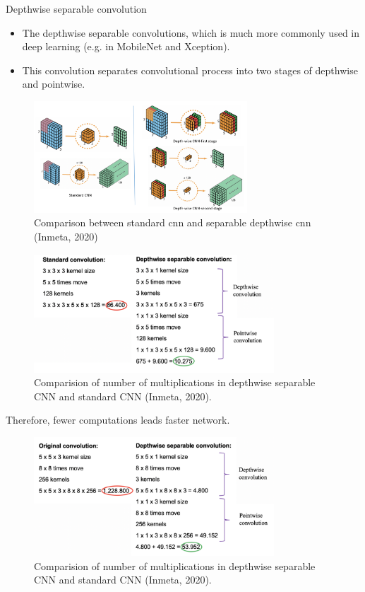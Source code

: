 \begin{vbframe}{Depthwise separable convolution}
   \begin{itemize}
     \item The depthwise separable convolutions, which is much more commonly used in deep learning (e.g. in MobileNet and Xception).
     \item This convolution separates convolutional process into two stages of depthwise and pointwise.
   \end{itemize}

 
\begin{figure}
\centering
\includegraphics[width=8cm]{plots/05_conv_variations/separable/Depthwise.png}
\caption{Comparison between standard cnn and separable depthwise cnn (Inmeta, 2020)}
\end{figure}
     
     
\begin{figure}
\centering
\includegraphics[width=9cm]{plots/05_conv_variations/separable/example-depthwise2.png}
\caption{Comparision of number of multiplications in depthwise separable CNN and standard CNN (Inmeta, 2020).}
\end{figure}
     
Therefore, fewer computations leads faster network.
     
\begin{figure}
\centering
\includegraphics[width=9cm]{plots/05_conv_variations/separable/example-depthwise1.png}
\caption{Comparision of number of multiplications in depthwise separable CNN and standard CNN (Inmeta, 2020).}
\end{figure}
     
\end{vbframe}

